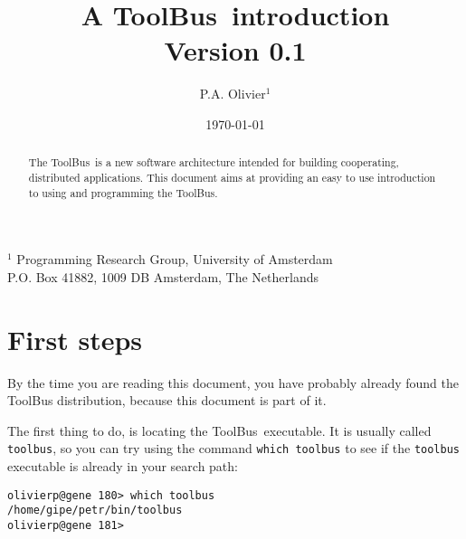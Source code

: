 \setlength{\oddsidemargin}{0.235cm}
\setlength{\evensidemargin}{0.235cm}
\setlength{\textwidth}{16cm}
\topmargin 0.5cm  %
\pagestyle{myheadings}


\newcommand{\TB}{{\sc ToolBus}}
\newcommand{\T}{{\bf T}}
\newcommand{\spec}[1]{{\rm #1}}
\newcommand{\script}[1]{{\tt #1}}
\newcommand{\ASFSDF}{{\sc Asf+Sdf}}
\newcommand{\ASF}{{\sc Asf}}
\newcommand{\SDF}{{\sc Sdf}}
\newcommand{\GEL}{{\sc Gel}}
\newcommand{\iter}{\,^*\,}
\newcommand{\emp}[1]{{\em #1}}
\newcommand{\txttt}[1]{{\tt #1}}



\title{A \TB\ introduction \\
Version 0.1}
\author{P.A. Olivier$^{1}$}
\date{\today}
\maketitle
\begin{center}
       {\footnotesize $^1$ Programming Research Group, University of Amsterdam\\
        P.O. Box 41882, 1009 DB Amsterdam, The Netherlands}
\end{center}

\begin{abstract}

The \TB\ is a new software architecture intended for building
cooperating, distributed applications.  This document aims
at providing an easy to use introduction to using and programming
the ToolBus.
\end{abstract}

\tableofcontents

\newpage

\section{First steps}

By the time you are reading this document, you have probably already
found the ToolBus distribution, because this document is part of it.

The first thing to do, is locating the \TB\ executable. It is usually
called {\tt toolbus}, so you can try using the command {\tt which toolbus}
to see if the {\tt toolbus} executable is already in your
search path:

\begin{verbatim}
olivierp@gene 180> which toolbus
/home/gipe/petr/bin/toolbus
olivierp@gene 181>
\end{verbatim}

